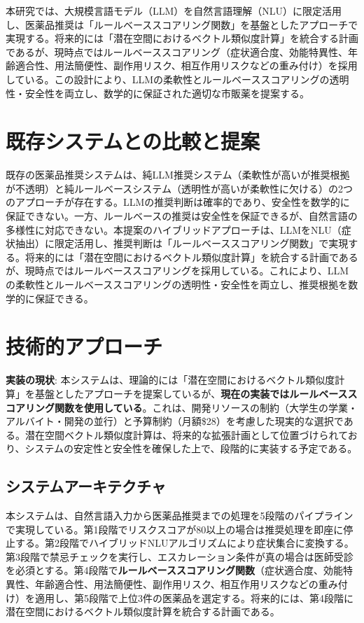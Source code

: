 \documentclass[a4paper,11pt,ja=standard,xelatex]{bxjsarticle}
\theoremstyle{definition}
\begin{document}
本研究では、大規模言語モデル（LLM）を自然言語理解（NLU）に限定活用し、医薬品推奨は「ルールベーススコアリング関数」を基盤としたアプローチで実現する。将来的には「潜在空間におけるベクトル類似度計算」を統合する計画であるが、現時点ではルールベーススコアリング（症状適合度、効能特異性、年齢適合性、用法簡便性、副作用リスク、相互作用リスクなどの重み付け）を採用している。この設計により、LLMの柔軟性とルールベーススコアリングの透明性・安全性を両立し、数学的に保証された適切な市販薬を提案する。

\section{既存システムとの比較と提案}

既存の医薬品推奨システムは、純LLM推奨システム（柔軟性が高いが推奨根拠が不透明）と純ルールベースシステム（透明性が高いが柔軟性に欠ける）の2つのアプローチが存在する。LLMの推奨判断は確率的であり、安全性を数学的に保証できない。一方、ルールベースの推奨は安全性を保証できるが、自然言語の多様性に対応できない。本提案のハイブリッドアプローチは、LLMをNLU（症状抽出）に限定活用し、推奨判断は「ルールベーススコアリング関数」で実現する。将来的には「潜在空間におけるベクトル類似度計算」を統合する計画であるが、現時点ではルールベーススコアリングを採用している。これにより、LLMの柔軟性とルールベーススコアリングの透明性・安全性を両立し、推奨根拠を数学的に保証できる。

\section{技術的アプローチ}

\textbf{実装の現状}: 本システムは、理論的には「潜在空間におけるベクトル類似度計算」を基盤としたアプローチを提案しているが、\textbf{現在の実装ではルールベーススコアリング関数を使用している}。これは、開発リソースの制約（大学生の学業・アルバイト・開発の並行）と予算制約（月額\$28）を考慮した現実的な選択である。潜在空間ベクトル類似度計算は、将来的な拡張計画として位置づけられており、システムの安定性と安全性を確保した上で、段階的に実装する予定である。

\subsection{システムアーキテクチャ}

本システムは、自然言語入力から医薬品推奨までの処理を5段階のパイプラインで実現している。第1段階でリスクスコアが80以上の場合は推奨処理を即座に停止する。第2段階でハイブリッドNLUアルゴリズムにより症状集合に変換する。第3段階で禁忌チェックを実行し、エスカレーション条件が真の場合は医師受診を必須とする。第4段階で\textbf{ルールベーススコアリング関数}（症状適合度、効能特異性、年齢適合性、用法簡便性、副作用リスク、相互作用リスクなどの重み付け）を適用し、第5段階で上位3件の医薬品を選定する。将来的には、第4段階に潜在空間におけるベクトル類似度計算を統合する計画である。
\end{document}
